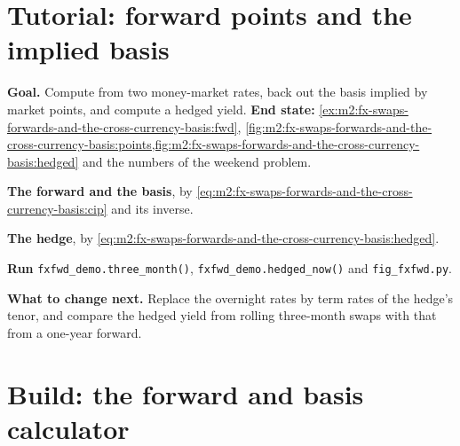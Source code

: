 \section{Tutorial: forward points and the implied basis}\label{tut:m2:fx-swaps-forwards-and-the-cross-currency-basis:basis}

\begin{tutorial}
\textbf{Goal.} Compute  from two money-market rates, back out the
basis implied by market points, and compute a hedged yield.
\textbf{End state:}
\cref{ex:m2:fx-swaps-forwards-and-the-cross-currency-basis:fwd},
\cref{fig:m2:fx-swaps-forwards-and-the-cross-currency-basis:points,fig:m2:fx-swaps-forwards-and-the-cross-currency-basis:hedged}
and the numbers of the weekend problem.
\begin{tutsteps}
\item \textbf{The forward and the basis}, by
\cref{eq:m2:fx-swaps-forwards-and-the-cross-currency-basis:cip} and its inverse.
\label{lst:m2:fx-swaps-forwards-and-the-cross-currency-basis:fwd}
\item \textbf{The hedge}, by
\cref{eq:m2:fx-swaps-forwards-and-the-cross-currency-basis:hedged}.
\label{lst:m2:fx-swaps-forwards-and-the-cross-currency-basis:hedge}
\item \textbf{Run} \texttt{fxfwd\_demo.three\_month()},
\texttt{fxfwd\_demo.hedged\_now()} and \texttt{fig\_fxfwd.py}.
\end{tutsteps}
\textbf{What to change next.} Replace the overnight rates by term rates of the
hedge's tenor, and compare the hedged yield from rolling three-month swaps with
that from a one-year forward.
\end{tutorial}

\section{Build: the forward and basis calculator}\label{bld:m2:fx-swaps-forwards-and-the-cross-currency-basis:fxfwd}

